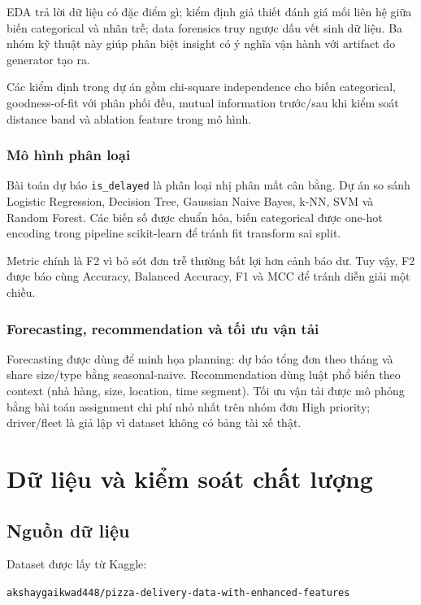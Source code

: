 \documentclass[12pt,a4paper,oneside]{report}
\newcommand{\code}[1]{\nolinkurl{#1}}
\begin{document}
EDA trả lời dữ liệu có đặc điểm gì; kiểm định giả thiết đánh giá mối liên hệ
giữa biến categorical và nhãn trễ; data forensics truy ngược dấu vết sinh dữ
liệu. Ba nhóm kỹ thuật này giúp phân biệt insight có ý nghĩa vận hành với
artifact do generator tạo ra.

Các kiểm định trong dự án gồm chi-square independence cho biến categorical,
goodness-of-fit với phân phối đều, mutual information trước/sau khi kiểm soát
distance band và ablation feature trong mô hình.

\subsection{Mô hình phân loại}

Bài toán dự báo \code{is\_delayed} là phân loại nhị phân mất cân bằng. Dự án so
sánh Logistic Regression, Decision Tree, Gaussian Naive Bayes, k-NN, SVM và
Random Forest. Các biến số được chuẩn hóa, biến categorical được one-hot
encoding trong pipeline scikit-learn để tránh fit transform sai split.

Metric chính là F2 vì bỏ sót đơn trễ thường bất lợi hơn cảnh báo dư. Tuy vậy,
F2 được báo cùng Accuracy, Balanced Accuracy, F1 và MCC để tránh diễn giải một
chiều.

\subsection{Forecasting, recommendation và tối ưu vận tải}

Forecasting được dùng để minh họa planning: dự báo tổng đơn theo tháng và share
size/type bằng seasonal-naive. Recommendation dùng luật phổ biến theo context
(nhà hàng, size, location, time segment). Tối ưu vận tải được mô phỏng bằng bài
toán assignment chi phí nhỏ nhất trên nhóm đơn High priority; driver/fleet là
giả lập vì dataset không có bảng tài xế thật.

\chapter{Dữ liệu và kiểm soát chất lượng}

\section{Nguồn dữ liệu}

Dataset được lấy từ Kaggle:

\begin{center}
\code{akshaygaikwad448/pizza-delivery-data-with-enhanced-features}
\end{center}
\end{document}
